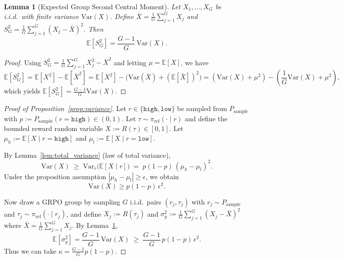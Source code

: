 \documentclass{article}
\theoremstyle{plain}
\newtheorem{lemma}[theorem]{Lemma}
\theoremstyle{definition}
\theoremstyle{remark}
\begin{document}
\begin{lemma}[Expected Group Second Central Moment]
\label{lem:expected_group_var}
Let $X_1,\dots,X_G$ be i.i.d.\ with finite variance $\text{Var}(X)$. Define $\bar{X}=\frac{1}{G}\sum_{j=1}^G X_j$ and $S_G^2=\frac{1}{G}\sum_{j=1}^G (X_j-\bar{X})^2$. Then
\begin{equation}
\mathbb{E}[S_G^2] = \frac{G-1}{G}\,\text{Var}(X).
\end{equation}
\end{lemma}

\begin{proof}
Using $S_G^2=\frac{1}{G}\sum_{j=1}^G X_j^2-\bar{X}^2$ and letting $\mu=\mathbb{E}[X]$, we have
\begin{equation}
\mathbb{E}[S_G^2] = \mathbb{E}[X^2] - \mathbb{E}[\bar{X}^2]
= \mathbb{E}[X^2] - \big(\text{Var}(\bar{X}) + (\mathbb{E}[\bar{X}])^2\big)
= (\text{Var}(X)+\mu^2) - \left(\frac{1}{G}\text{Var}(X)+\mu^2\right),
\end{equation}
which yields $\mathbb{E}[S_G^2]=\frac{G-1}{G}\text{Var}(X)$.
\end{proof}

\begin{proof}[Proof of Proposition~\ref{prop:variance}]
Let $r\in\{\texttt{high},\texttt{low}\}$ be sampled from $P_{\mathrm{sample}}$ with $p:=P_{\mathrm{sample}}(r=\texttt{high})\in(0,1)$. Let $\tau\sim \pi_{\mathrm{ref}}(\cdot\mid r)$ and define the bounded reward random variable $X:=R(\tau)\in[0,1]$. Let $\mu_h:=\mathbb{E}[X\mid r=\texttt{high}]$ and $\mu_l:=\mathbb{E}[X\mid r=\texttt{low}]$.

By Lemma~\ref{lem:total_variance} (law of total variance),
\begin{equation}
\text{Var}(X) \;\ge\; \text{Var}_{r}\!\big(\mathbb{E}[X\mid r]\big)
 \;=\; p(1-p)\,(\mu_h-\mu_l)^2.
\end{equation}
Under the proposition assumption $|\mu_h-\mu_l|\ge \epsilon$, we obtain
\begin{equation}
\text{Var}(X) \ge p(1-p)\,\epsilon^2.
\end{equation}

Now draw a GRPO group by sampling $G$ i.i.d.\ pairs $(r_j,\tau_j)$ with $r_j\sim P_{\mathrm{sample}}$ and $\tau_j\sim \pi_{\mathrm{ref}}(\cdot\mid r_j)$, and define $X_j:=R(\tau_j)$ and $\sigma_g^2:=\frac{1}{G}\sum_{j=1}^G (X_j-\bar{X})^2$ where $\bar{X}=\frac{1}{G}\sum_{j=1}^G X_j$. By Lemma~\ref{lem:expected_group_var},
\begin{equation}
\mathbb{E}[\sigma_g^2] = \frac{G-1}{G}\,\text{Var}(X)
\;\ge\; \frac{G-1}{G}\,p(1-p)\,\epsilon^2.
\end{equation}
Thus we can take $\kappa=\frac{G-1}{G}p(1-p)$.
\end{proof}
\end{document}
